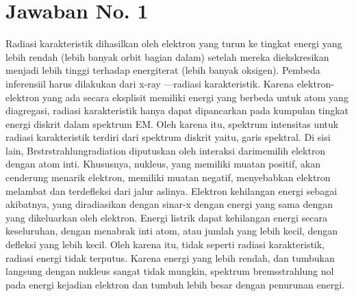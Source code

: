\section{Jawaban No. 1}
Radiasi karakteristik dihasilkan oleh elektron yang turun ke tingkat energi yang lebih rendah (lebih banyak orbit bagian dalam) setelah mereka diekskresikan menjadi lebih tinggi terhadap energiterat (lebih banyak oksigen). Pembeda inferensiil harus dilakukan dari x-ray —radiasi karakteristik. Karena elektron-elektron yang ada secara eksplisit memiliki energi yang berbeda untuk atom yang diagregasi, radiasi karakteristik hanya dapat dipancarkan pada kumpulan tingkat energi diskrit dalam spektrum EM. Oleh karena itu, spektrum intensitas untuk radiasi karakteristik terdiri dari spektrum diskrit yaitu, garis spektral. Di sisi lain, Brstrstrahlungradiation diputuskan oleh interaksi darimemilih elektron dengan atom inti. Khususnya, nukleus, yang memiliki muatan positif, akan cenderung menarik elektron, memiliki muatan negatif, menyebabkan elektron melambat dan terdefleksi dari jalur aslinya. Elektron kehilangan energi sebagai akibatnya, yang diradiasikan dengan sinar-x dengan energi yang sama dengan yang dikeluarkan oleh elektron. Energi listrik dapat kehilangan energi secara keseluruhan, dengan menabrak inti atom, atau jumlah yang lebih kecil, dengan defleksi yang lebih kecil. Oleh karena itu, tidak seperti radiasi karakteristik, radiasi energi tidak terputus. Karena energi yang lebih rendah, dan tumbukan langsung dengan nukleus sangat tidak mungkin, spektrum bremsstrahlung nol pada energi kejadian elektron dan tumbuh lebih besar dengan penurunan energi.

